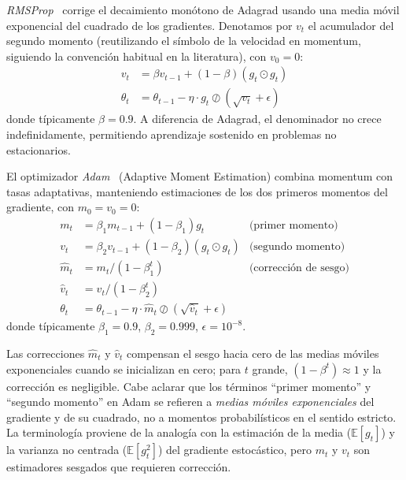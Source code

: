 \begin{definition}[RMSProp]\label{def:rmsprop}
	\textit{RMSProp}~\citep{hinton2012rmsprop} corrige el decaimiento monótono de Adagrad usando una media móvil exponencial del cuadrado de los gradientes. Denotamos por \(v_t\) el acumulador del segundo momento (reutilizando el símbolo de la velocidad en momentum, siguiendo la convención habitual en la literatura), con \(v_0 = 0\):
	\begin{align*}
		v_t &= \beta v_{t-1} + (1-\beta) (g_t \odot g_t) \\
		\theta_t &= \theta_{t-1} - \eta \cdot g_t \oslash (\sqrt{v_t} + \epsilon)
	\end{align*}
	donde típicamente \(\beta = 0.9\). A diferencia de Adagrad, el denominador no crece indefinidamente, permitiendo aprendizaje sostenido en problemas no estacionarios.
\end{definition}

\begin{definition}[Adam]\label{def:adam}
	El optimizador \textit{Adam}~\citep{kingma2014adam} (Adaptive Moment Estimation) combina momentum con tasas adaptativas, manteniendo estimaciones de los dos primeros momentos del gradiente, con \(m_0 = v_0 = 0\):
	\begin{align*}
		m_t &= \beta_1 m_{t-1} + (1-\beta_1) g_t & \text{(primer momento)} \\
		v_t &= \beta_2 v_{t-1} + (1-\beta_2) (g_t \odot g_t) & \text{(segundo momento)} \\
		\hat{m}_t &= m_t / (1 - \beta_1^t) & \text{(corrección de sesgo)} \\
		\hat{v}_t &= v_t / (1 - \beta_2^t) & \\
		\theta_t &= \theta_{t-1} - \eta \cdot \hat{m}_t \oslash (\sqrt{\hat{v}_t} + \epsilon)
	\end{align*}
	donde típicamente \(\beta_1 = 0.9\), \(\beta_2 = 0.999\), \(\epsilon = 10^{-8}\).
\end{definition}

Las correcciones \(\hat{m}_t\) y \(\hat{v}_t\) compensan el sesgo hacia cero de las medias móviles exponenciales cuando se inicializan en cero; para \(t\) grande, \((1 - \beta^t) \approx 1\) y la corrección es negligible. Cabe aclarar que los términos ``primer momento'' y ``segundo momento'' en \gls{Adam} se refieren a \textit{medias móviles exponenciales} del gradiente y de su cuadrado, no a momentos probabilísticos en el sentido estricto. La terminología proviene de la analogía con la estimación de la media (\(\mathbb{E}[g_t]\)) y la varianza no centrada (\(\mathbb{E}[g_t^2]\)) del gradiente estocástico, pero \(m_t\) y \(v_t\) son estimadores sesgados que requieren corrección.


